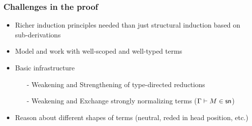 \documentclass{beamer}
\begin{document}
\begin{frame}
  \frametitle{Challenges in the proof}
  \begin{itemize}
  \item Richer induction principles needed than just structural  induction based on sub-derivations
  \item Model and work with well-scoped and well-typed terms 
  \item Basic infrastructure
    \begin{itemize}
    \item[-] Weakening and Strengthening of type-directed reductions
    \item[-] Weakening and Exchange strongly normalizing terms ($\Gamma \vdash M \in \mathsf{sn}$)
    \end{itemize}

  \item Reason about different shapes of terms (neutral, reded in head
    position, etc.)
  \end{itemize}
\end{frame}
\end{document}
